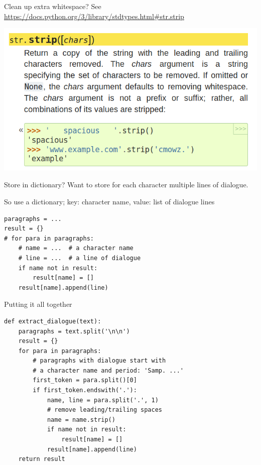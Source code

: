\documentclass[aspectratio=169,usenames,dvipsnames]{beamer}
\begin{document}
\begin{frame}[fragile]{Clean up extra whitespace?}
    See \url{https://docs.python.org/3/library/stdtypes.html\#str.strip}

    \vspace{1em}
    \centering
    \includegraphics[width=0.9\linewidth]{fig/stripdocs}
\end{frame}

\begin{frame}[fragile]{Store in dictionary?}
    Want to store for each character multiple lines of dialogue.

    \vspace{1em}
    So use a dictionary; key: character name, value: list of dialogue lines
\begin{lstlisting}
paragraphs = ...
result = {}
# for para in paragraphs:
    # name = ...  # a character name
    # line = ...  # a line of dialogue
    if name not in result:
        result[name] = []
    result[name].append(line)
\end{lstlisting}
\end{frame}

\begin{frame}[fragile]{Putting it all together}
\begin{lstlisting}
def extract_dialogue(text):
    paragraphs = text.split('\n\n')
    result = {}
    for para in paragraphs:
        # paragraphs with dialogue start with
        # a character name and period: 'Samp. ...'
        first_token = para.split()[0]
        if first_token.endswith('.'):
            name, line = para.split('.', 1)
            # remove leading/trailing spaces
            name = name.strip()
            if name not in result:
                result[name] = []
            result[name].append(line)
    return result
\end{lstlisting}
\end{frame}
\end{document}
